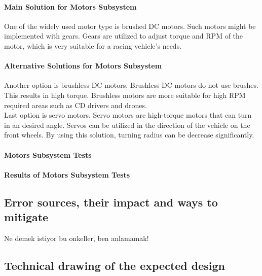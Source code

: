 \documentclass[a4paper,12pt]{article}
\begin{document}
	\paragraph{Main Solution for Motors Subsystem}
	
	One of the widely used motor type is brushed DC motors. Such motors might be implemented with gears. Gears are utilized to adjust torque and RPM of the motor, which is very suitable for a racing vehicle's needs. \\
	
	\paragraph{Alternative Solutions for Motors Subsystem}
	
 	Another option is brushless DC motors. Brushless DC motors do not use brushes. This results in high torque. Brushless motors are more suitable for high RPM required areas such as CD drivers and drones.\\
	
	Last option is servo motors. Servo motors are high-torque motors that can turn in an desired angle. Servos can be utilized in the direction of the vehicle on the front wheels. By using this solution, turning radius can be decrease significantly.\\
	
	\paragraph{Motors Subsystem Tests}
	
	\paragraph{Results of Motors Subsystem Tests}
	
	
	
	
	
	\newpage
	\subsection{ Error sources, their impact and ways to mitigate}
	
	Ne demek istiyor bu onkeller, ben anlamamak!
	
	\subsection{Technical drawing of the expected design}
	
\end{document}
